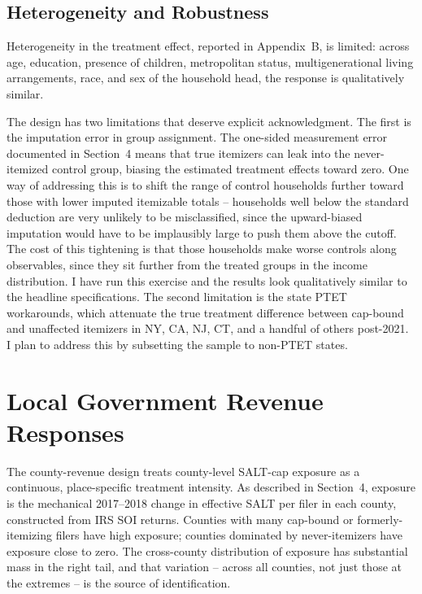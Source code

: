 \documentclass[12pt]{article}
\begin{document}
\subsection*{Heterogeneity and Robustness}

Heterogeneity in the treatment effect, reported in Appendix~B, is limited: across age, education, presence of children, metropolitan status, multigenerational living arrangements, race, and sex of the household head, the response is qualitatively similar.

The design has two limitations that deserve explicit acknowledgment. The first is the imputation error in group assignment. The one-sided measurement error documented in Section~4 means that true itemizers can leak into the never-itemized control group, biasing the estimated treatment effects toward zero. One way of addressing this is to shift the range of control households further toward those with lower imputed itemizable totals -- households well below the standard deduction are very unlikely to be misclassified, since the upward-biased imputation would have to be implausibly large to push them above the cutoff. The cost of this tightening is that those households make worse controls along observables, since they sit further from the treated groups in the income distribution. I have run this exercise and the results look qualitatively similar to the headline specifications. The second limitation is the state PTET workarounds, which attenuate the true treatment difference between cap-bound and unaffected itemizers in NY, CA, NJ, CT, and a handful of others post-2021. I plan to address this by subsetting the sample to non-PTET states.


\section{Local Government Revenue Responses}

The county-revenue design treats county-level SALT-cap exposure as a continuous, place-specific treatment intensity. As described in Section~4, exposure is the mechanical 2017--2018 change in effective SALT per filer in each county, constructed from IRS SOI returns. Counties with many cap-bound or formerly-itemizing filers have high exposure; counties dominated by never-itemizers have exposure close to zero. The cross-county distribution of exposure has substantial mass in the right tail, and that variation -- across all counties, not just those at the extremes -- is the source of identification.
\end{document}
